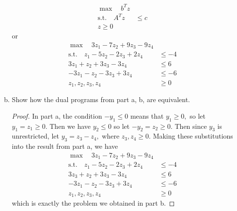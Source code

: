 \documentclass{article}
\begin{document}
\begin{enumerate}
\begin{enumerate}[a)]
\begin{soln}
					\begin{align*}
						\max\quad b^T z & \\
						\text{s.t.}\quad A^T z&\le c \\
						z\ge 0
					\end{align*} or
					\begin{align*}
						\max\quad 3z_1-7z_2+9z_3-9z_4 & \\
						\text{s.t.}\quad z_1-5z_2-2z_3+2z_4 &\le -4 \\
						3z_1+z_2+3z_3-3z_4 &\le 6 \\
						-3z_1-z_2-3z_3+3z_4 &\le -6 \\
						z_1, z_2, z_3, z_4 &\ge 0
					\end{align*}
				\end{soln}

			\item Show how the dual programs from part a, b, are equivalent.
				\begin{proof}
					In part a, the condition $-y_1\le 0$ means that $y_1\ge 0,$ so let $y_1=z_1\ge 0.$ Then we have $y_2\le 0$ so let $-y_2=z_2\ge 0.$ Then since $y_3$ is unrestricted, let $y_3=z_3-z_4,$ where $z_3, z_4\ge 0.$ Making these substitutions into the result from part a, we have
					\begin{align*}
						\max\quad 3z_1-7z_2+9z_3-9z_4 & \\
						\text{s.t.}\quad z_1-5z_2-2z_3+2z_4 &\le -4 \\
						3z_3+z_2+3z_3-3z_4 &\le 6 \\
						-3z_1-z_2-3z_3+3z_4 &\le -6 \\
						z_1, z_2, z_3, z_4 &\ge 0
					\end{align*} which is exactly the problem we obtained in part b.
					
				\end{proof}

		\end{enumerate}


\end{enumerate}
\end{document}
